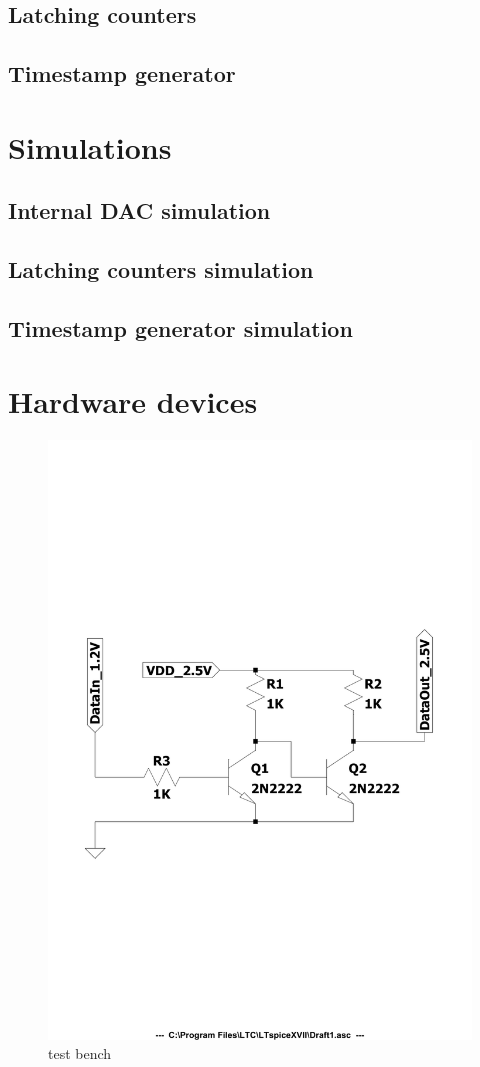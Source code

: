 \subsection{Latching counters}

\subsection{Timestamp generator}

\section{Simulations}

\subsection{Internal DAC simulation}

\subsection{Latching counters simulation}

\subsection{Timestamp generator simulation}

\section{Hardware devices}\label{hardware}

\begin{figure}[H]
	\centering
	\includegraphics[width=0.7\linewidth]{IMG/ch4/DIAGRAM}
	\caption{test bench}
	\label{fig:diagram}
\end{figure}


